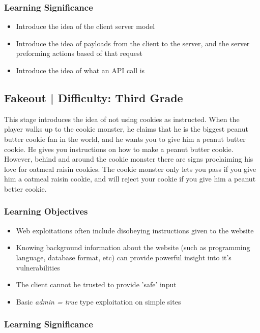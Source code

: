 \documentclass{article}
\begin{document}
\subsubsection{Learning Significance}

\begin{itemize}
  \item Introduce the idea of the client server model
  \item Introduce the idea of payloads from the client to the server,
    and the server preforming actions based of that request
  \item Introduce the idea of what an API call is
\end{itemize}

\subsection{Fakeout | Difficulty: Third Grade}

This stage introduces the idea of not using cookies as instructed. When the player
walks up to the cookie monster, he claims that he is the biggest
peanut butter cookie fan in the world, and he wants you to give him a
peanut butter cookie. He gives you instructions on how to make a
peanut butter cookie. However, behind and around the cookie monster there are
signs proclaiming his love for oatmeal raisin cookies. The cookie
monster only lets you pass if you give him a oatmeal raisin cookie,
and will reject your cookie if you give him a peanut better cookie. 

\subsubsection{Learning Objectives}

\begin{itemize}
  \item Web exploitations often include disobeying instructions given
    to the website
  \item Knowing background information about the website (such as
    programming language, database format, etc) can provide powerful
    insight into it's vulnerabilities
  \item The client cannot be trusted to provide 'safe' input
  \item Basic \textit{admin = true} type exploitation on simple sites
\end{itemize}

\subsubsection{Learning Significance}
\end{document}
